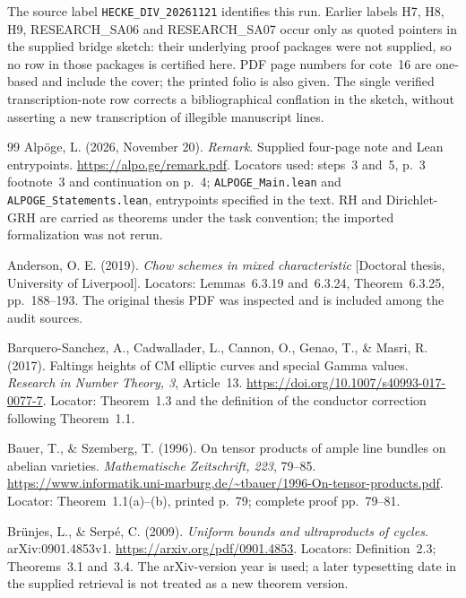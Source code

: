 \documentclass[11pt,a4paper]{article}
\theoremstyle{definition}\newtheorem{definition}[theorem]{Definition}
\theoremstyle{remark}\newtheorem{remark}[theorem]{Remark}
\begin{document}
The source label \texttt{HECKE\_DIV\_20261121} identifies this run. Earlier labels H7, H8, H9, RESEARCH\_SA06 and RESEARCH\_SA07 occur only as quoted pointers in the supplied bridge sketch: their underlying proof packages were not supplied, so no row in those packages is certified here. PDF page numbers for cote~16 are one-based and include the cover; the printed folio is also given. The single verified transcription-note row corrects a bibliographical conflation in the sketch, without asserting a new transcription of illegible manuscript lines.

\begin{thebibliography}{99}
Alp\"oge, L. (2026, November 20). \emph{Remark}. Supplied four-page note and Lean entrypoints. \url{https://alpo.ge/remark.pdf}. Locators used: steps~3 and~5, p.~3 footnote~3 and continuation on p.~4; \texttt{ALPOGE\_Main.lean} and \texttt{ALPOGE\_Statements.lean}, entrypoints specified in the text. RH and Dirichlet-GRH are carried as theorems under the task convention; the imported formalization was not rerun.

Anderson, O. E. (2019). \emph{Chow schemes in mixed characteristic} [Doctoral thesis, University of Liverpool]. Locators: Lemmas~6.3.19 and~6.3.24, Theorem~6.3.25, pp.~188--193. The original thesis PDF was inspected and is included among the audit sources.

Barquero-Sanchez, A., Cadwallader, L., Cannon, O., Genao, T., \& Masri, R. (2017). Faltings heights of CM elliptic curves and special Gamma values. \emph{Research in Number Theory, 3}, Article~13. \url{https://doi.org/10.1007/s40993-017-0077-7}. Locator: Theorem~1.3 and the definition of the conductor correction following Theorem~1.1.

Bauer, T., \& Szemberg, T. (1996). On tensor products of ample line bundles on abelian varieties. \emph{Mathematische Zeitschrift, 223}, 79--85. \url{https://www.informatik.uni-marburg.de/~tbauer/1996-On-tensor-products.pdf}. Locator: Theorem~1.1(a)--(b), printed p.~79; complete proof pp.~79--81.

Br\"unjes, L., \& Serp\'e, C. (2009). \emph{Uniform bounds and ultraproducts of cycles}. arXiv:0901.4853v1. \url{https://arxiv.org/pdf/0901.4853}. Locators: Definition~2.3; Theorems~3.1 and~3.4. The arXiv-version year is used; a later typesetting date in the supplied retrieval is not treated as a new theorem version.


\end{thebibliography}
\end{document}
